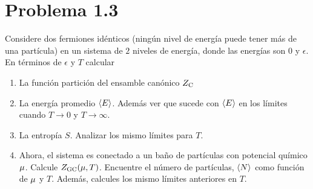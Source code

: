 \section{Problema 1.3}

\begin{tcolorbox}
\begin{problema}
	Considere dos fermiones idénticos (ningún nivel de energía puede tener más de una partícula) en un sistema de $2$ niveles de energía, donde las energías son $0$ y $\epsilon$. En términos de $\epsilon$ y $T$ calcular
	\begin{enumerate}
		\item La función partición del ensamble canónico $Z_{\rm C}$
		\item La energía promedio $\ev{E}$. Además ver que sucede con $\ev{E}$ en los límites cuando $T\to 0$ y $T\to\infty$.
		\item La entropía $S$. Analizar los mismo límites para $T$.
		\item Ahora, el sistema es conectado a un baño de partículas con potencial químico $\mu$. Calcule $Z_{\rm GC}(\mu,T)$. Encuentre el número  de partículas, $\ev{N}$ como función de $\mu$ y $T$. Además, calcules los mismo límites anteriores en $T$.
	\end{enumerate}
\end{problema}
\end{tcolorbox}


